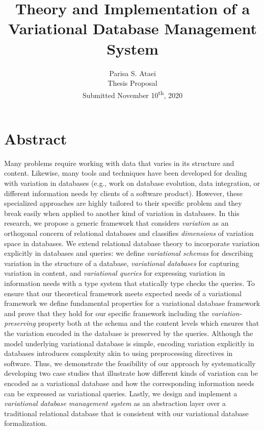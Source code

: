 \documentclass[11pt]{article}
\begin{document}
\title{Theory and Implementation of a Variational Database Management System}

\author{Parisa S. Ataei\\
Thesis Proposal \\
Submitted November 10\textsuperscript{th}, 2020
}
\date{}

\maketitle

\section*{Abstract}
Many problems require working with data that varies in its structure and content. Likewise, many tools and techniques have been developed for dealing with variation in databases (e.g., work on database evolution, data integration, or different information needs by clients of a software product).
%
However, these specialized approaches are highly tailored to their specific problem and they break easily when applied to another kind of variation in databases.
%
In this research, we propose a generic framework that considers
\emph{variation} as an orthogonal concern of relational databases
and classifies \emph{dimensions} of variation space in databases.
We extend relational database theory to incorporate variation
explicitly in databases and queries:
we define \emph{variational schemas} for describing variation in the structure of a database,
\emph{variational databases} for capturing variation in content,
and \emph{variational queries} for expressing variation in information needs
with a type system that statically type checks the queries.
%
To ensure that our theoretical framework meets expected needs of a variational framework
we define fundamental  properties for a variational database framework and prove that they hold
for our specific framework including the \emph{variation-preserving} property
both at the schema and the content levels which ensures that the variation encoded in the 
database is preserved by the queries. 
%
Although the model underlying variational database is simple, encoding variation
explicitly in databases introduces complexity akin to using preprocessing
directives in software. 
%
Thus, we demonstrate the feasibility of our approach by systematically developing two case studies
that illustrate how different kinds of variation can be encoded
as a variational database and how the
corresponding information needs can be expressed as variational queries.
%
Lastly, we design and implement a \emph{variational database management system} as an abstraction layer over a traditional relational database that is consistent with our variational database formalization.
\end{document}
